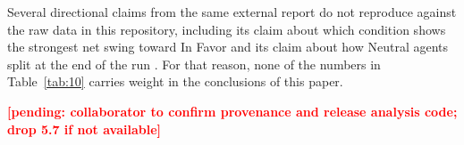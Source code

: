 \documentclass[11pt,a4paper]{article}
\newcommand{\pending}[1]{\textcolor{red}{\textbf{[#1]}}}
\newcommand{\src}[1]{\unskip\marginpar{\raggedright\tiny\textcolor{gray}{#1}}}
\newcommand{\src}[1]{\unskip}
\begin{document}
Several directional claims from the same external report do not reproduce against the raw data in this repository, including its claim about which condition shows the strongest net swing toward In Favor and its claim about how Neutral agents split at the end of the run \src{R: full\_ablation\_summary.md, Section 6}. For that reason, none of the numbers in Table~\ref{tab:10} carries weight in the conclusions of this paper.

\pending{pending: collaborator to confirm provenance and release analysis code; drop 5.7 if not available}

\end{document}
